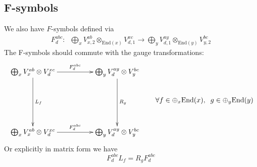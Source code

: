 \documentclass[12pt,a4paper]{article}
\newcommand{\tp}{\otimes}
\begin{document}
\subsection{F-symbols}
We also have $F$-symbols defined via 
\begin{align}
F^{abc}_d: \; \; \bigoplus_x V^{ab}_{x,2} \tp_{\text{End}(x)} V^{xc}_{d,1} \rightarrow \bigoplus_y V^{ay}_{d,1} \tp_{\text{End}(y)} V^{bc}_{y,2}
\end{align}
The F-symbols should commute with the gauge transformations:
\begin{align}
	\vcenter{\xymatrix @!0 @M=1mm @R=30mm @C=42mm{
		 \bigoplus_x V^{ab}_x \otimes V^{xc}_d \ar[d]^{L_{f}}\ar[r]^{F^{abc}_d}& \bigoplus_y V^{ay}_d \otimes V^{bc}_y \ar[d]^{R_{g}} \\
		\bigoplus_x V^{ab}_x \otimes V^{xc}_d  \ar[r]^{F^{abc}_d}  & \bigoplus_y V^{ay}_d \otimes V^{bc}_y	
	}} 
	{ \quad\quad \forall f \in \oplus_x \text{End}(x), \; \; g \in \oplus_y \text{End}(y)}
	\label{Fcommute}
\end{align}
 Or explicitly in matrix form we have
 $$
 F^{abc}_d  L_f=   R_g F^{abc}_d
 $$
\end{document}
